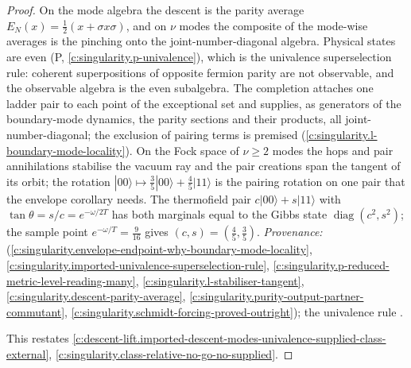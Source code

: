 \documentclass[11pt]{article}
\theoremstyle{definition}
\theoremstyle{plain}
\providecommand{\EN}{}\renewcommand{\EN}{E_{N}}
\providecommand{\ket}{}\renewcommand{\ket}[1]{|#1\rangle}
\begin{document}
\begin{proof}
On the mode algebra the descent is the parity average $\EN(x) = \tfrac12(x + \sigma x\sigma)$, and on $\nu$ modes the composite of the mode-wise averages is the pinching onto the joint-number-diagonal algebra. Physical states are even (P, \ref{c:singularity.p-univalence}), which is the univalence superselection rule: coherent superpositions of opposite fermion parity are not observable, and the observable algebra is the even subalgebra. The completion attaches one ladder pair to each point of the exceptional set and supplies, as generators of the boundary-mode dynamics, the parity sections and their products, all joint-number-diagonal; the exclusion of pairing terms is premised (\ref{c:singularity.l-boundary-mode-locality}). On the Fock space of $\nu \geq 2$ modes the hops and pair annihilations stabilise the vacuum ray and the pair creations span the tangent of its orbit; the rotation $\ket{00} \mapsto \tfrac35\ket{00} + \tfrac45\ket{11}$ is the pairing rotation on one pair that the envelope corollary needs. The thermofield pair $c\ket{00} + s\ket{11}$ with $\tan\theta = s/c = e^{-\omega/2T}$ has both marginals equal to the Gibbs state $\operatorname{diag}(c^{2}, s^{2})$; the sample point $e^{-\omega/T} = \tfrac{9}{16}$ gives $(c, s) = (\tfrac45, \tfrac35)$. \emph{Provenance:} \cite[Thm.~5.7, Prop.~9.6, Prem.~7.8, Fact~7.9, Prem.~7.30, Thm.~C.8, Prop.~13.4, Cor.~11.6, Lem.~7.2, Thm.~7.27]{ButlerT5} (\ref{c:singularity.envelope-endpoint-why-boundary-mode-locality}, \ref{c:singularity.imported-univalence-superselection-rule}, \ref{c:singularity.p-reduced-metric-level-reading-many}, \ref{c:singularity.l-stabiliser-tangent}, \ref{c:singularity.descent-parity-average}, \ref{c:singularity.purity-output-partner-commutant}, \ref{c:singularity.schmidt-forcing-proved-outright}); the univalence rule \cite{WWW1952}.

This restates \ref{c:descent-lift.imported-descent-modes-univalence-supplied-class-external}, \ref{c:singularity.class-relative-no-go-no-supplied}.

\end{proof}
\end{document}
